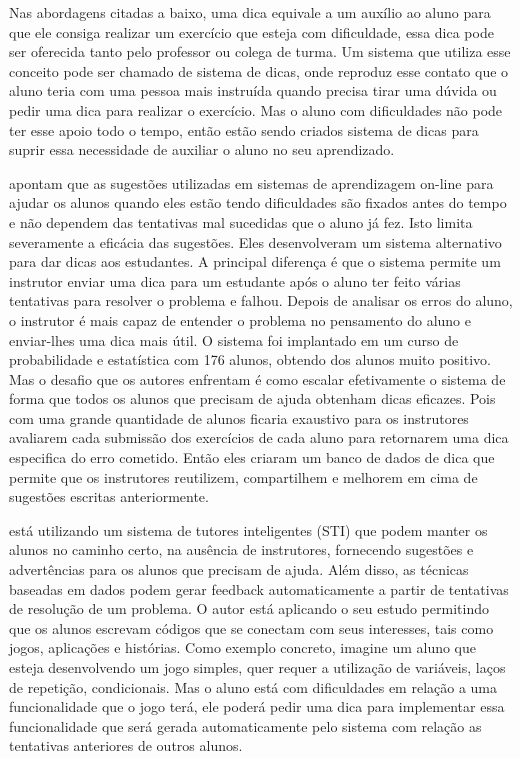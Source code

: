 Nas abordagens citadas a baixo, uma dica equivale a um auxílio ao aluno para que ele consiga realizar um exercício que esteja com dificuldade, essa dica pode ser oferecida tanto pelo professor ou colega de turma. Um sistema que utiliza esse conceito pode ser chamado de sistema de dicas, onde reproduz esse contato que o aluno teria com uma pessoa mais instruída quando precisa tirar uma dúvida ou pedir uma dica para realizar o exercício. Mas o aluno com dificuldades não pode ter esse apoio todo o tempo, então estão sendo criados sistema de dicas para suprir essa necessidade de auxiliar o aluno no seu aprendizado.

 apontam que as sugestões utilizadas em sistemas de aprendizagem on-line para ajudar os alunos quando eles estão tendo dificuldades são fixados antes do tempo e não dependem das tentativas mal sucedidas que o aluno já fez. Isto limita severamente a eficácia das sugestões. Eles desenvolveram um sistema alternativo para dar dicas aos estudantes. A principal diferença é que o sistema permite um instrutor enviar uma dica para um estudante após o aluno ter feito várias tentativas para resolver o problema e falhou. Depois de analisar os erros do aluno, o instrutor é mais capaz de entender o problema no pensamento do aluno e enviar-lhes uma dica mais útil. O sistema foi implantado em um curso de probabilidade e estatística com 176 alunos, obtendo  dos alunos muito positivo. Mas o desafio que os autores enfrentam é como escalar efetivamente o sistema de forma que todos os alunos que precisam de ajuda obtenham dicas eficazes. Pois com uma grande quantidade de alunos ficaria exaustivo para os instrutores avaliarem cada submissão dos exercícios de cada aluno para retornarem uma dica especifica do erro cometido. Então eles criaram um banco de dados de dica que permite que os instrutores reutilizem, compartilhem e melhorem em cima de sugestões escritas anteriormente.

 está utilizando um sistema de tutores inteligentes (STI) que podem manter os alunos no caminho certo, na ausência de instrutores, fornecendo sugestões e advertências para os alunos que precisam de ajuda. Além disso, as técnicas baseadas em dados podem gerar feedback automaticamente a partir de tentativas de resolução de um problema. O autor está aplicando o seu estudo permitindo que os alunos escrevam códigos que se conectam com seus interesses, tais como jogos, aplicações e histórias. Como exemplo concreto, imagine um aluno que esteja desenvolvendo um jogo simples, quer requer a utilização de variáveis, laços de repetição, condicionais. Mas o aluno está com dificuldades em relação a uma funcionalidade que o jogo terá, ele poderá pedir uma dica para implementar essa funcionalidade que será gerada automaticamente pelo sistema com relação as tentativas anteriores de outros alunos.

